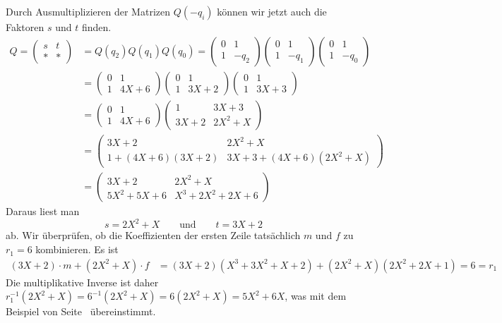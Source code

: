 \begin{beispiel}
Durch Ausmultiplizieren der Matrizen $Q(-q_i)$ können wir jetzt auch die 
Faktoren $s$ und $t$ finden.
\begin{align*}
Q=\begin{pmatrix}
s&t\\
*&*
\end{pmatrix}
&= Q(q_2)Q(q_1)Q(q_0)
=
\begin{pmatrix}0&1\\1&-q_2\end{pmatrix}
\begin{pmatrix}0&1\\1&-q_1\end{pmatrix}
\begin{pmatrix}0&1\\1&-q_0\end{pmatrix}
\\
&=
\begin{pmatrix}
0&1\\
1&4X+6
\end{pmatrix}
\begin{pmatrix}
0&1\\
1&3X+2
\end{pmatrix}
\begin{pmatrix}
0&1\\
1&3X+3
\end{pmatrix}
\\
&=
\begin{pmatrix}
0&1\\
1&4X+6
\end{pmatrix}
\begin{pmatrix}
   1&3X+3\\
3X+2&2X^2 + X
\end{pmatrix}
\\
&=
\begin{pmatrix}
3X+2           &2X^2+X\\
1+(4X+6)(3X+2) &3X+3 + (4X+6)(2X^2+X)
\end{pmatrix}
\\
&=
\begin{pmatrix}
     3X+2 & 2X^2     +X\\
5X^2+5X+6 &  X^3+2X^2+2X+6
\end{pmatrix}
\end{align*}
Daraus liest man
\[
s
=
2X^2+X
\qquad\text{und}\qquad
t
=
3X+2
\]
ab.
Wir überprüfen, ob die Koeffizienten der ersten Zeile tatsächlich $m$ und $f$
zu $r_1=6$ kombinieren.
Es ist
\begin{align*}
(3X+2)\cdot m + (2X^2+X)\cdot f
&= 
(3X+2)
(X^3+3X^2+X+2)
+
(2X^2+X)
(2X^2+2X+1)
=
6=r_1
\end{align*}
Die multiplikative Inverse ist daher
$
r_1^{-1}(2X^2 + X)
=
6^{-1}
(2X^2 + X)
=
6
(2X^2 + X)
=
5X^2+6X$,
was mit dem Beispiel von
Seite~\pageref{buch:endlichekoerper:beispiel:inversemitmatrix}
übereinstimmt.
\end{beispiel}

